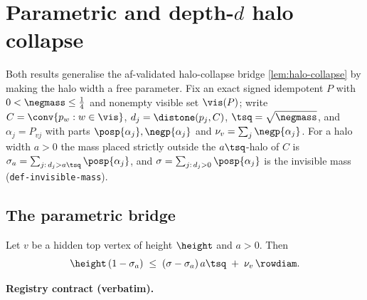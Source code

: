 \section{Parametric and depth-\texorpdfstring{$d$}{d} halo collapse}\label{sec:parametric-halo-collapse}

Both results generalise the af-validated halo-collapse bridge \ref{lem:halo-collapse} by making the
halo width a free parameter. Fix an exact signed idempotent $P$ with $0<\negmass\le\tfrac14$ and
nonempty visible set $\vis(P)$; write $C=\conv\{p_w:w\in\vis\}$, $d_j=\distone(p_j,C)$, $\tsq=\sqrt{\negmass}$, and
$\alpha_j=P_{vj}$ with parts $\posp{\alpha_j},\negp{\alpha_j}$ and $\nu_v=\sum_j\negp{\alpha_j}$. For a
halo width $a>0$ the mass placed strictly outside the $a\tsq$-halo of $C$ is
$\sigma_a=\sum_{j:\,d_j>a\tsq}\posp{\alpha_j}$, and $\sigma=\sum_{j:\,d_j>0}\posp{\alpha_j}$ is the
invisible mass (\texttt{def-invisible-mass}).

\subsection{The parametric bridge}

\begin{lemma}\label{lem:parametric-halo-collapse}
Let $v$ be a hidden top vertex of height $\height$ and $a>0$. Then
\begin{equation}\label{eq:phc-parametric}
  \height\,(1-\sigma_a)\;\le\;(\sigma-\sigma_a)\,a\tsq\;+\;\nu_v\,\rowdiam .
\end{equation}
\end{lemma}

\noindent\textbf{Registry contract (verbatim).}

